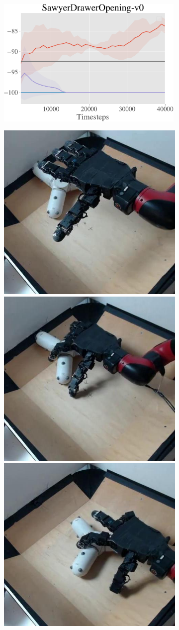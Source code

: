 \begin{figure}[t]
\begin{subfigure}[b]{0.28\textwidth}
        \includegraphics[width=0.99\textwidth]{awac/figures/robot/drawer_curve-crop.pdf}
    \end{subfigure}
    \begin{subfigure}[b]{0.28\textwidth}
        \center
        \hspace{0.02\linewidth}
        \includegraphics[height=0.22\linewidth]{awac/figures/filmstrip_hand/vid_0.jpg}
        \includegraphics[height=0.22\linewidth]{awac/figures/filmstrip_hand/vid_70.jpg}
        \includegraphics[height=0.22\linewidth]{awac/figures/filmstrip_hand/vid_190.jpg}
            \vspace{0.1cm}


\end{subfigure}
\end{figure}
